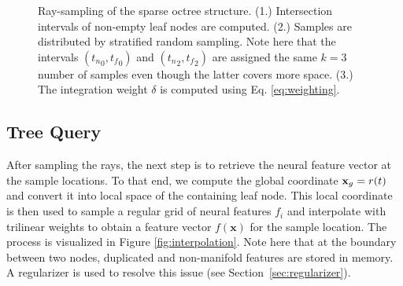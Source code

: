 \documentclass[acmtog,nonacm]{acmart} \acmSubmissionID{0438}
\newcommand{\vvec}[1]{\mathbf{#1}}   \newcommand{\mmat}[1]{\mathbf{\uppercase{#1}}}
\newcommand{\ttt}{t}          \newcommand{\ts}{{t_n}}       \newcommand{\te}{{t_f}}       \newcommand{\x}{\vvec{x}}     \newcommand{\feat}{f}
\begin{document}
\begin{figure}
{		Ray-sampling of the sparse octree structure. 
		(1.) Intersection intervals of non-empty leaf nodes are computed. 
		(2.) Samples are distributed by stratified random sampling. 
		Note here that the intervals $(\ts_0, \te_0)$ and $(\ts_2, \te_2)$ are assigned the same $k=3$ number of samples even though the latter covers more space.
		(3.) The integration weight $\delta$ is computed using Eq. \eqref{eq:weighting}.
	}
	\label{fig:tree_sampling}
\end{figure}

\subsection{Tree Query}
\label{sec:integration}
After sampling the rays, the next step is to retrieve the neural feature vector at the sample locations.
To that end, we compute the global coordinate $\x_g = \ray(\ttt)$ and convert it into local space of the containing leaf node.
This local coordinate is then used to sample a regular grid of neural features $\feat_i$ and interpolate with trilinear weights to obtain a feature vector $\feat(\x)$ for the sample location.
The process is visualized in Figure \ref{fig:interpolation}.
Note here that at the boundary between two nodes, duplicated and non-manifold features are stored in memory.
A regularizer is used to resolve this issue (see Section~\ref{sec:regularizer}).
\end{document}
